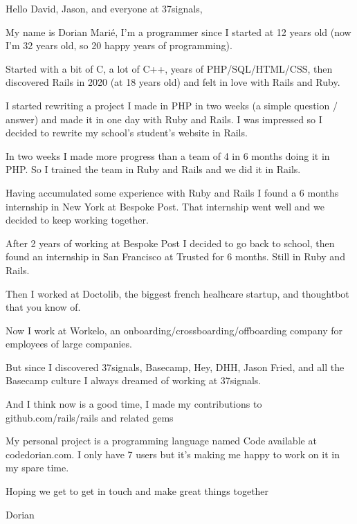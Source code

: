 \documentclass{article}
\begin{document}
Hello David, Jason, and everyone at 37signals,
\newline

My name is Dorian Marié, I'm a programmer since I started at 12 years old (now I'm 32 years old, so 20 happy years of programming).
\newline

Started with a bit of C, a lot of C++, years of PHP/SQL/HTML/CSS, then discovered Rails in 2020 (at 18 years old) and felt in love with Rails and Ruby.
\newline

I started rewriting a project I made in PHP in two weeks (a simple question / answer) and made it in one day with Ruby and Rails. I was impressed so I decided to rewrite my school's student's website in Rails.
\newline

In two weeks I made more progress than a team of 4 in 6 months doing it in PHP. So I trained the team in Ruby and Rails and we did it in Rails.
\newline

Having accumulated some experience with Ruby and Rails I found a 6 months internship in New York at Bespoke Post. That internship went well and we decided to keep working together.
\newline

After 2 years of working at Bespoke Post I decided to go back to school, then found an internship in San Francisco at Trusted for 6 months. Still in Ruby and Rails.
\newline

Then I worked at Doctolib, the biggest french healhcare startup, and thoughtbot that you know of.
\newline

Now I work at Workelo, an onboarding/crossboarding/offboarding company for employees of large companies.
\newline

But since I discovered 37signals, Basecamp, Hey, DHH, Jason Fried, and all the Basecamp culture I always dreamed of working at 37signals.
\newline

And I think now is a good time, I made my contributions to github.com/rails/rails and related gems
\newline

My personal project is a programming language named Code available at codedorian.com. I only have 7 users but it's making me happy to work on it in my spare time.
\newline

Hoping we get to get in touch and make great things together
\newline

Dorian
\newline
\end{document}
